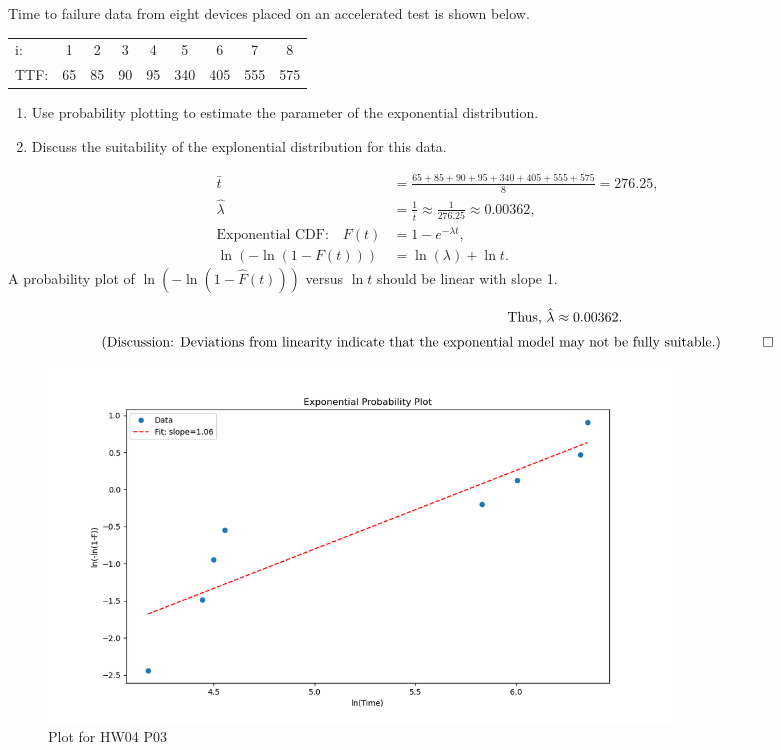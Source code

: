 \begin{hwkProblem}{3}{}

	Time to failure data from eight devices placed on an accelerated test is shown below.
	\begin{center}
		\begin{tabular}{lcccccccc}
			i: & 1 & 2 & 3 & 4 & 5 & 6 & 7 & 8 \\
			TTF: & 65 & 85 & 90 & 95 & 340 & 405 & 555 & 575
		\end{tabular}
	\end{center}
	\begin{enumerate}
		\item Use probability plotting to estimate the parameter of the exponential distribution.
		\item Discuss the suitability of the explonential distribution for this data.
	\end{enumerate}

	\hwkSol

	\begin{align*}
		\bar{t} &= \frac{65+85+90+95+340+405+555+575}{8} = 276.25,\\[1mm]
		\hat{\lambda} &= \frac{1}{\bar{t}} \approx \frac{1}{276.25} \approx 0.00362,\\[1mm]
		\text{Exponential CDF:}\quad F(t) &= 1 - e^{-\lambda t},\\[1mm]
		\ln(-\ln(1-F(t))) &= \ln(\lambda) + \ln t.
	\end{align*}
	A probability plot of $\ln(-\ln(1-\hat{F}(t)))$ versus $\ln t$ should be linear with slope 1.

	\begin{align*}
		\text{Thus, } \hat{\lambda} &\approx 0.00362.\\[1mm]
		\text{(Discussion: Deviations from linearity indicate that the exponential model} &\text{ may not be fully suitable.)} \quad \qed
	\end{align*}

	\begin{figure}[H]
		\begin{center}
			\includegraphics[width=0.8\textwidth]{./images/s03.png}
		\end{center}
		\caption{Plot for HW04 P03}\label{fig:s03}
	\end{figure}

	\hwkCode

	

\end{hwkProblem}

